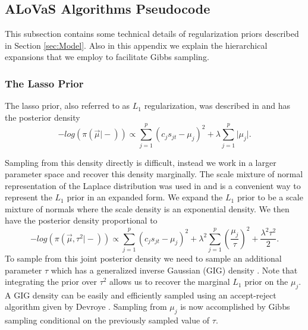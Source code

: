 \subsection{ALoVaS Algorithms Pseudocode}\label{sec:pseudo}

This subsection contains some technical details of regularization priors described in Section \ref{sec:Model}.
Also in this appendix we explain the hierarchical expansions that we employ to facilitate Gibbs sampling. 

		\subsubsection{The Lasso Prior}\label{sec:lasso_app}
		The lasso prior, also referred to as $L_1$ regularization, was described in \cite{tibshirani1996regression} and has the posterior density
\begin{equation}\label{eqn:l1_prior}
 -log(\pi(\vec{\mu} \vert -)) \propto \sum_{j=1}^p (c_j s_{jt} -\mu_j)^2 +\lambda\sum_{j=1}^p \vert \mu_j \vert.
 \end{equation} 
 
 Sampling from this density directly is difficult, instead we work in a larger parameter space and recover this density marginally. 	
The scale mixture of normal representation of the Laplace distribution was used in \cite{park2008bayesian} and is a convenient way to represent the $L_1$ prior in an expanded form. 
 We expand the $L_1$ prior to be a scale mixture of normals where the scale density is an exponential density. We then have the posterior density proportional to 
 \begin{equation}%
 -log(\pi(\vec{\mu}, \tau^2 \vert -)) \propto \sum_{j=1}^p (c_js_{jt}-\mu_j)^2 + \lambda^2\sum_{j=1}^p \left(\frac{\mu_j}{\tau}\right)^2 +\frac{\lambda^2\tau^2}{2}.\nonumber
 \end{equation}
To sample from this joint posterior density we need to sample an additional parameter $\tau$ which has a generalized inverse Gaussian (GIG) density \cite{chhikara1989inverse,devroye1986non}. Note that integrating the prior over $\tau^2$ allows us to recover the marginal $L_1$ prior on the $\mu_j$. A GIG density can be easily and efficiently sampled using an accept-reject algorithm given by Devroye \cite{devroye1986non}.  Sampling from $\mu_j$ is now accomplished by Gibbs sampling conditional on the previously sampled value of $\tau$. 

